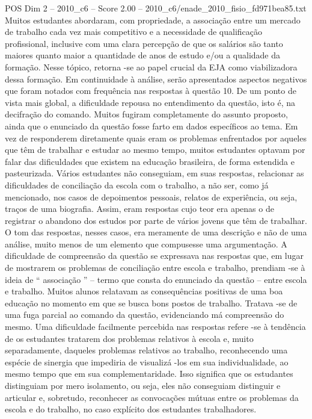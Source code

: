 \begin{textsample}{POS Dim 2 – 2010\_c6 – Score 2.00 – 2010\_c6/enade\_2010\_fisio\_fd971bea85.txt}
Muitos estudantes abordaram, com propriedade, a associação entre um mercado de trabalho cada vez mais competitivo e a necessidade de qualificação profissional, inclusive com uma clara percepção de que os salários são tanto maiores quanto maior a quantidade de anos de estudo e/ou a qualidade da formação.
Nesse tópico, retorna -se ao papel crucial da EJA como viabilizadora dessa formação.
Em continuidade à análise, serão apresentados aspectos negativos que foram notados com frequência nas respostas à questão 10.
De um ponto de vista mais global, a dificuldade repousa no entendimento da questão, isto é, na decifração do comando.
Muitos fugiram completamente do assunto proposto, ainda que o enunciado da questão fosse farto em dados específicos ao tema.
Em vez de responderem diretamente quais eram os problemas enfrentados por aqueles que têm de trabalhar e estudar ao mesmo tempo, muitos estudantes optavam por falar das dificuldades que existem na educação brasileira, de forma estendida e pasteurizada.
Vários estudantes não conseguiam, em suas respostas, relacionar as dificuldades de conciliação da escola com o trabalho, a não ser, como já mencionado, nos casos de depoimentos pessoais, relatos de experiência, ou seja, traços de uma biografia.
Assim, eram respostas cujo teor era apenas o de registrar o abandono dos estudos por parte de vários jovens que têm de trabalhar.
O tom das respostas, nesses casos, era meramente de uma descrição e não de uma análise, muito menos de um elemento que compusesse uma argumentação.
A dificuldade de compreensão da questão se expressava nas respostas que, em lugar de mostrarem os problemas de conciliação entre escola e trabalho, prendiam -se à ideia de “ associação ” – termo que consta do enunciado da questão – entre escola e trabalho.
Muitos alunos relatavam as consequências positivas de uma boa educação no momento em que se busca bons postos de trabalho.
Tratava -se de uma fuga parcial ao comando da questão, evidenciando má compreensão do mesmo.
Uma dificuldade facilmente percebida nas respostas refere -se à tendência de os estudantes tratarem dos problemas relativos à escola e, muito separadamente, daqueles problemas relativos ao trabalho, reconhecendo uma espécie de sinergia que impediria de visualizá -los em sua individualidade, ao mesmo tempo que em sua complementaridade.
Isso significa que os estudantes distinguiam por mero isolamento, ou seja, eles não conseguiam distinguir e articular e, sobretudo, reconhecer as convocações mútuas entre os problemas da escola e do trabalho, no caso explícito dos estudantes trabalhadores.

\end{textsample}
